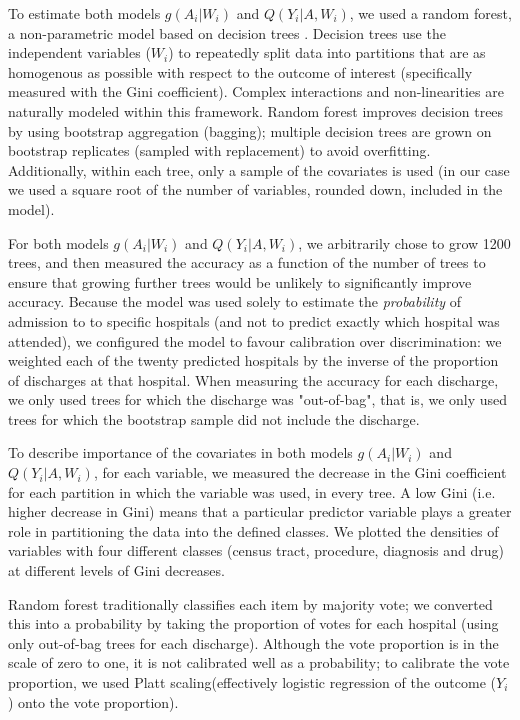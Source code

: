 \documentclass[]{article}\usepackage[]{graphicx}\usepackage[]{color}
\begin{document}
To estimate both models $g(A_i|W_i)$ and $Q(Y_i|A,W_i)$, we used a random forest, a non-parametric model based on decision trees \supercite{breiman_random_2001}. Decision trees use the independent variables ($W_i$) to repeatedly split data into partitions that are as homogenous as possible with respect to the outcome of interest (specifically measured with the Gini coefficient\supercite{gini_variabilita_1912}). Complex interactions and non-linearities are naturally modeled within this framework. Random forest improves decision trees by using bootstrap aggregation (bagging); multiple decision trees are grown on bootstrap replicates (sampled with replacement) to avoid overfitting. Additionally, within each tree, only a sample of the covariates is used (in our case we used a square root of the number of variables, rounded down, included in the model).

For both models $g(A_i|W_i)$ and $Q(Y_i|A,W_i)$, we arbitrarily chose to grow 1200 trees, and then measured the accuracy as a function of the number of trees to ensure that growing further trees would be unlikely to significantly improve accuracy. Because the model was used solely to estimate the \emph{probability} of admission to to specific hospitals (and not to predict exactly which hospital was attended), we configured the model to favour calibration over discrimination: we weighted each of the twenty predicted hospitals by the inverse of the proportion of discharges at that hospital. When measuring the accuracy for each discharge, we only used trees for which the discharge was "out-of-bag", that is, we only used trees for which the bootstrap sample did not include the discharge.

To describe importance of the covariates in both models $g(A_i|W_i)$ and $Q(Y_i|A,W_i)$, for each variable, we measured the decrease in the Gini coefficient for each partition in which the variable was used, in every tree. A low Gini (i.e. higher decrease in Gini) means that a particular predictor variable plays a greater role in partitioning the data into the defined classes. We plotted the densities of variables with four different classes (census tract, procedure, diagnosis and drug) at different levels of Gini decreases.

Random forest traditionally classifies each item by majority vote; we converted this into a probability by taking the proportion of votes for each hospital (using only out-of-bag trees for each discharge). Although the vote proportion is in the scale of zero to one, it is not calibrated well as a probability; to calibrate the vote proportion, we used Platt scaling(effectively logistic regression of the outcome ($Y_i$) onto the vote proportion). 
\end{document}
